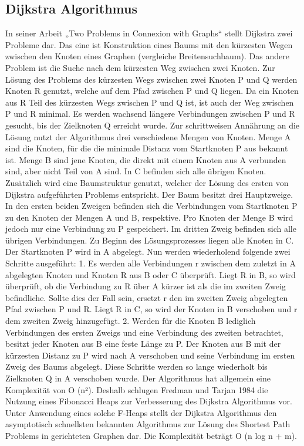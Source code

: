 \subsection{Dijkstra Algorithmus}

In seiner Arbeit „Two Problems in Connexion with Graphs“ stellt Dijkstra zwei Probleme dar\cite{Dijkstra.1959}. Das eine ist Konstruktion eines Baums mit den kürzesten Wegen zwischen den Knoten eines Graphen (vergleiche Breitensuchbaum). Das andere Problem ist die Suche nach dem kürzesten Weg zwischen zwei Knoten.
Zur Lösung des Problems des kürzesten Wegs zwischen zwei Knoten P und Q werden Knoten R genutzt, welche auf dem Pfad zwischen P und Q liegen. Da ein Knoten aus R Teil des kürzesten Wegs zwischen P und Q ist, ist auch der Weg zwischen P und R minimal. Es werden wachsend längere Verbindungen zwischen P und R gesucht, bis der Zielknoten Q erreicht wurde.
Zur schrittweisen Annährung an die Lösung nutzt der Algorithmus drei verschiedene Mengen von Knoten. Menge A sind die Knoten, für die die minimale Distanz vom Startknoten P aus bekannt ist. Menge B sind jene Knoten, die direkt mit einem Knoten aus A verbunden sind, aber nicht Teil von A sind. In C befinden sich alle übrigen Knoten.
Zusätzlich wird eine Baumstruktur genutzt, welcher der Lösung des ersten von Dijkstra aufgeführten Problems entspricht. Der Baum besitzt drei Hauptzweige. In den ersten beiden Zweigen befinden sich die Verbindungen vom Startknoten P zu den Knoten der Mengen A und B, respektive. Pro Knoten der Menge B wird jedoch nur eine Verbindung zu P gespeichert. Im dritten Zweig befinden sich alle übrigen Verbindungen. 
Zu Beginn des Lösungsprozesses liegen alle Knoten in C. Der Startknoten P wird in A abgelegt. Nun werden wiederholend folgende zwei Schritte ausgeführt:
1.	Es werden alle Verbindungen r zwischen dem zuletzt in A abgelegten Knoten und Knoten R aus B oder C überprüft. Liegt R in B, so wird überprüft, ob die Verbindung zu R über A kürzer ist als die im zweiten Zweig befindliche. Sollte dies der Fall sein, ersetzt r den im zweiten Zweig abgelegten Pfad zwischen P und R. Liegt R in C, so wird der Knoten in B verschoben und r dem zweiten Zweig hinzugefügt.
2.	Werden für die Knoten B lediglich Verbindungen des ersten Zweigs und eine Verbindung des zweiten betrachtet, besitzt jeder Knoten aus B eine feste Länge zu P. Der Knoten aus B mit der kürzesten Distanz zu P wird nach A verschoben und seine Verbindung im ersten Zweig des Baums abgelegt.
Diese Schritte werden so lange wiederholt bis Zielknoten Q in A verschoben wurde.
Der Algorithmus hat allgemein eine Komplexität von O (n²)\cite{Madkour.2017}. Deshalb schlugen Fredman und Tarjan 1984 die Nutzung eines Fibonacci Heaps zur Verbesserung des Dijkstra Algorithmus vor\cite{Fredman.1987}. Unter Anwendung eines solche F-Heaps stellt der Dijkstra Algorithmus den asymptotisch schnellsten bekannten Algorithmus zur Lösung des Shortest Path Problems in gerichteten Graphen dar\cite{Schmitz.2019}.  Die Komplexität beträgt O (n log n + m)\cite{Madkour.2017}. 



